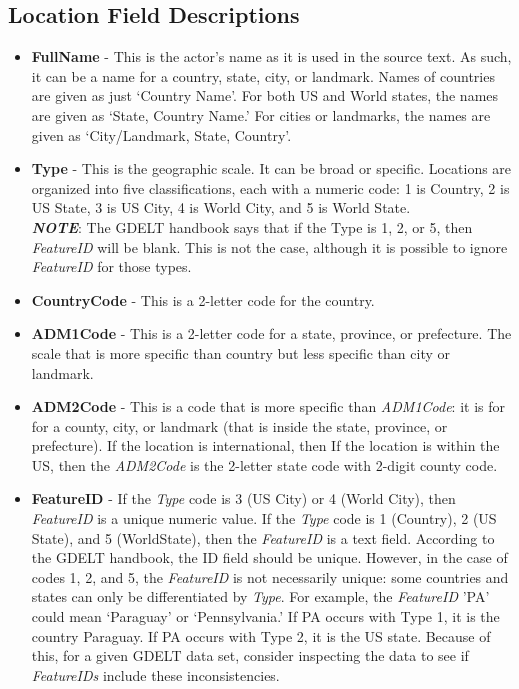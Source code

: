 \subsection{Location Field Descriptions}
	\begin{itemize} 

\item \textbf{FullName} - This is the actor's name as it is used in the source text. As such, it can be a name for a country, state, city, or landmark. Names of countries are given as just `Country Name'. For both US and World states, the names are given as `State, Country Name.' For cities or landmarks, the names are given as `City/Landmark, State, Country'.

\item \textbf{Type} - This is the geographic scale. It can be broad or specific. Locations are organized into five classifications, each with a numeric code: 1 is Country, 2 is US State, 3 is US City, 4 is World City, and 5 is World State. \\ \textbf{\textit{NOTE}}: The GDELT handbook says that if the  Type is 1, 2, or 5, then \textit{FeatureID} will be blank. This is not the case, although it is possible to ignore \textit{FeatureID} for those types.

\item \textbf{CountryCode} - This is a 2-letter code for the country.

\item \textbf{ADM1Code} - This is a 2-letter code for a state, province, or prefecture. The scale that is more specific than country but less specific than city or landmark. 

\item \textbf{ADM2Code} - This is a code that is more specific than \textit{ADM1Code}: it is for for a county, city, or landmark (that is inside the state, province, or prefecture). 
If the location is international, then %
If the location is within the US, then the \textit{ADM2Code} is the 2-letter state code with 2-digit county code. %

\item \textbf{FeatureID} - If the \textit{Type} code is 3 (US City) or 4 (World City), then \textit{FeatureID} is a unique numeric value. 
If the \textit{Type} code is 1 (Country), 2 (US State), and 5 (WorldState), then the \textit{FeatureID} is a text field. 
According to the GDELT handbook, the ID field should be unique. 
However, in the case of codes 1, 2, and 5, the \textit{FeatureID} is not necessarily unique: some countries and states can only be differentiated by \textit{Type}. For example, the \textit{FeatureID} 'PA' could mean `Paraguay' or `Pennsylvania.' If PA occurs with Type 1, it is the country Paraguay. If PA occurs with Type 2, it is the US state. Because of this, for a given GDELT data set, consider inspecting the data to see if \textit{FeatureIDs} include these inconsistencies.


\end{itemize}
